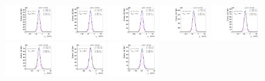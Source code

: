 \begin{figure}[htb]
\includegraphics[width=0.19\textwidth]{plots/Appendix_Recoil_Fits/WmpMC_PF_13TeV_2G/pfu1fit_16.pdf}
\includegraphics[width=0.19\textwidth]{plots/Appendix_Recoil_Fits/WmpMC_PF_13TeV_2G/pfu1fit_18.pdf}
\includegraphics[width=0.19\textwidth]{plots/Appendix_Recoil_Fits/WmpMC_PF_13TeV_2G/pfu1fit_19.pdf}
\includegraphics[width=0.19\textwidth]{plots/Appendix_Recoil_Fits/WmpMC_PF_13TeV_2G/pfu1fit_20.pdf}
\includegraphics[width=0.19\textwidth]{plots/Appendix_Recoil_Fits/WmpMC_PF_13TeV_2G/pfu1fit_21.pdf}
\includegraphics[width=0.19\textwidth]{plots/Appendix_Recoil_Fits/WmpMC_PF_13TeV_2G/pfu1fit_22.pdf}
\includegraphics[width=0.19\textwidth]{plots/Appendix_Recoil_Fits/WmpMC_PF_13TeV_2G/pfu1fit_23.pdf}
\includegraphics[width=0.19\textwidth]{plots/Appendix_Recoil_Fits/WmpMC_PF_13TeV_2G/pfu1fit_24.pdf}

\end{figure}
